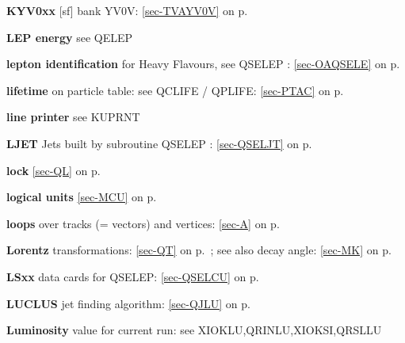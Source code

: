  \item{\bf KYV0xx  }[sf] bank YV0V: \ref{sec-TVAYV0V} on p.~\pageref{sec-TVAYV0V}
 
 \item{\bf LEP energy} see QELEP  \\
 \item{\bf lepton identification } for Heavy Flavours, see QSELEP : \ref{sec-OAQSELE} on p.~\pageref{sec-OAQSELE}\\
 \item{\bf lifetime   }on particle table: see QCLIFE / QPLIFE:
 \ref{sec-PTAC} on p.~\pageref{sec-PTAC}\\
 \item{\bf line printer    }see KUPRNT\\
 \item{\bf LJET } Jets built by subroutine QSELEP : \ref{sec-QSELJT} on p.~\pageref{sec-QSELJT}\\
 \item{\bf lock        }\ref{sec-QL} on p.~\pageref{sec-QL}\\
 \item{\bf logical units  }\ref{sec-MCU} on p.~\pageref{sec-MCU}\\
 \item{\bf loops       }over tracks (= vectors) and vertices:
 \ref{sec-A} on p.~\pageref{sec-A}\\
 \item{\bf Lorentz     }transformations: \ref{sec-QT} on p.~\pageref{sec-QT};
 see also decay angle: \ref{sec-MK} on p.~\pageref{sec-MK}\\
 \item{\bf LSxx    }data cards for QSELEP: \ref{sec-QSELCU} on p.~\pageref{sec-QSELCU}\\
 \item{\bf LUCLUS }jet finding algorithm: \ref{sec-QJLU} on p.~\pageref{sec-QJLU}\\
 \item{\bf Luminosity  }value for current run: see XIOKLU,QRINLU,XIOKSI,QRSLLU
 
